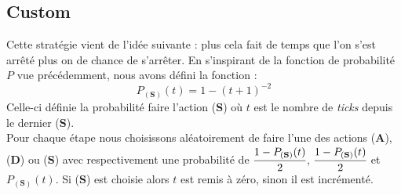 \subsection{Custom}
Cette stratégie vient de l'idée suivante : plus cela fait de temps que l'on s'est arrêté plus on de chance de s'arrêter.
En s'inspirant de la fonction de probabilité $P$ vue précédemment, nous avons
défini la fonction :
$$P_{(\textbf{S})}(t) = 1 - (t + 1)^{-2}$$
Celle-ci définie la probabilité faire l'action (\textbf{S}) où $t$ est le nombre de \emph{ticks} depuis
le dernier (\textbf{S}).\\
Pour chaque étape nous choisissons aléatoirement de faire l'une des actions  
(\textbf{A}), (\textbf{D}) ou (\textbf{S}) avec respectivement une probabilité
de $\cfrac{1 - P_{(\textbf{S})}(t)}{2}$, $\cfrac{1 - P_{(\textbf{S})}(t)}{2}$ et $P_{(\textbf{S})}(t)$. Si (\textbf{S}) est choisie
alors $t$ est remis à zéro, sinon il est incrémenté.